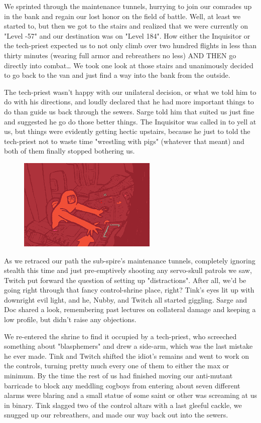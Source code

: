 We sprinted through the maintenance tunnels, hurrying to join our comrades up in the bank and regain our lost honor on the field of battle. 
Well, at least we started to, but then we got to the stairs and realized that we were currently on "Level -57" and our destination was on "Level 184". 
How either the Inquisitor or the tech-priest expected us to not only climb over two hundred flights in less than thirty minutes (wearing full armor and rebreathers no less) AND THEN go directly into combat… We took one look at those stairs and unanimously decided to go back to the van and just find a way into the bank from the outside.

The tech-priest wasn't happy with our unilateral decision, or what we told him to do with his directions, and loudly declared that he had more important things to do than guide us back through the sewers. 
Sarge told him that suited us just fine and suggested he go do those better things. 
The Inquisitor was called in to yell at us, but things were evidently getting hectic upstairs, because he just to told the tech-priest not to waste time "wrestling with pigs" (whatever that meant) and both of them finally stopped bothering us.

\begin{figure}
	\begin{center}
		\includegraphics[width=\figwidth]{pics/18/20.png}
	\end{center}
\end{figure}
As we retraced our path the sub-spire's maintenance tunnels, completely ignoring stealth this time and just pre-emptively shooting any servo-skull patrols we saw, Twitch put forward the question of setting up "distractions". 
After all, we'd be going right through that fancy control-shrine place, right? 
Tink's eyes lit up with downright evil light, and he, Nubby, and Twitch all started giggling. 
Sarge and Doc shared a look, remembering past lectures on collateral damage and keeping a low profile, but didn't raise any objections.

We re-entered the shrine to find it occupied by a tech-priest, who screeched something about "blasphemers" and drew a side-arm, which was the last mistake he ever made. 
Tink and Twitch shifted the idiot's remains and went to work on the controls, turning pretty much every one of them to either the max or minimum. 
By the time the rest of us had finished moving our anti-mutant barricade to block any meddling cogboys from entering about seven different alarms were blaring and a small statue of some saint or other was screaming at us in binary. 
Tink slagged two of the control altars with a last gleeful cackle, we snugged up our rebreathers, and made our way back out into the sewers.

